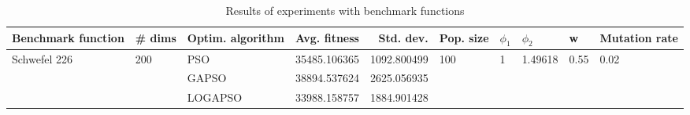 \begin{table}
\centering
\caption{Results of experiments with benchmark functions}
\begin{tabular}{lllrrlllll}
\toprule
           Benchmark function &              \# dims & Optim. algorithm &  Avg. fitness &   Std. dev. &            Pop. size &         $\phi_{1}$ &               $\phi_{2}$ &                     w &         Mutation rate \\
\midrule
\multirow{3}{*}{Schwefel 226} & \multirow{3}{*}{200} &              PSO &  35485.106365 & 1092.800499 & \multirow{3}{*}{100} & \multirow{3}{*}{1} & \multirow{3}{*}{1.49618} & \multirow{3}{*}{0.55} & \multirow{3}{*}{0.02} \\
                              &                      &            GAPSO &  38894.537624 & 2625.056935 &                      &                    &                          &                       &                       \\
                              &                      &          LOGAPSO &  33988.158757 & 1884.901428 &                      &                    &                          &                       &                       \\
\bottomrule
\end{tabular}
\end{table}
